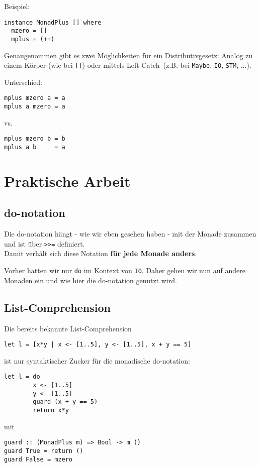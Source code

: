 \documentclass{beamer}
\begin{document}
\begin{frame}[fragile]
Beispiel:
\begin{verbatim}
instance MonadPlus [] where
  mzero = []
  mplus = (++)
\end{verbatim}
\pause
Genaugenommen gibt es zwei Möglichkeiten für ein Distributivgesetz: Analog zu einem Körper (wie bei \texttt{[]}) oder mittels \glqq Left Catch\grqq \ (z.B. bei \texttt{Maybe}, \texttt{IO}, \texttt{STM}, ...).\bigskip

\pause
Unterschied:
\begin{verbatim}
mplus mzero a = a
mplus a mzero = a
\end{verbatim}
vs.
\begin{verbatim}
mplus mzero b = b
mplus a b     = a
\end{verbatim}
\end{frame}



\section{Praktische Arbeit}

\subsection{do-notation}
\begin{frame}[fragile]
Die do-notation hängt - wie wir eben gesehen haben - mit der Monade zusammen und ist über \texttt{>>=} definiert.\\
\pause
Damit verhält sich diese Notation \textbf{für jede Monade anders}.\bigskip

\pause
Vorher hatten wir nur \texttt{do} im Kontext von \texttt{IO}. Daher gehen wir nun auf andere Monaden ein und wie hier die do-notation genutzt wird.
\end{frame}


\subsection{List-Comprehension}
\begin{frame}[fragile]
Die bereits bekannte List-Comprehension
\begin{verbatim}
let l = [x*y | x <- [1..5], y <- [1..5], x + y == 5]
\end{verbatim}
ist nur syntaktischer Zucker für die monadische do-notation:
\begin{verbatim}
let l = do
        x <- [1..5]
        y <- [1..5]
        guard (x + y == 5)
        return x*y
\end{verbatim}
mit
\begin{verbatim}
guard :: (MonadPlus m) => Bool -> m ()
guard True = return ()
guard False = mzero
\end{verbatim}

\end{frame}
\end{document}
